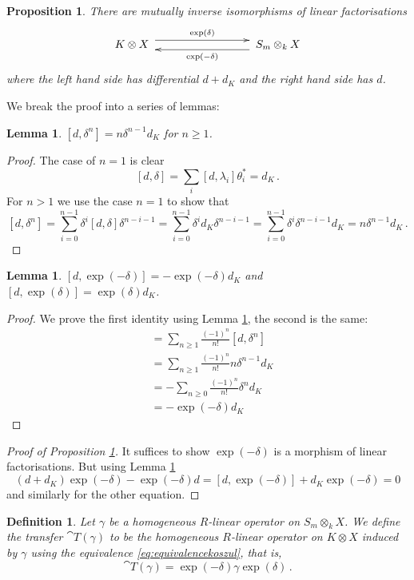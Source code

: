 \documentclass[english,letter paper,12pt,leqno]{article}
\newtheorem{proposition}[theorem]{Proposition}
\newtheorem{lemma}[theorem]{Lemma}
\theoremstyle{example}
\newtheorem{definition}[theorem]{Definition}
\numberwithin{equation}{section}
\def\be{\begin{equation}}
\def\ee{\end{equation}}
\begin{document}
\begin{proposition}\label{prop:equivalencekoszul} There are mutually inverse isomorphisms of linear factorisations
\be\label{eq:equivalencekoszul}
\xymatrix@C+5pc{ K \otimes X\; \ar@<1ex>[r]^-{ \exp(\delta) } & \;S_m \otimes_k X \ar@<1ex>[l]^-{ \exp(-\delta) } }
\ee
where the left hand side has differential $d + d_K$ and the right hand side has $d$.
\end{proposition}

We break the proof into a series of lemmas:

\begin{lemma}\label{lemma:pert1} $[d, \delta^n] = n \delta^{n-1} d_K$ for $n \ge 1$.
\end{lemma}
\begin{proof}
The case of $n = 1$ is clear
\[
[d, \delta] = \sum_i [d, \lambda_i] \theta_i^* = d_K\,.
\]
For $n > 1$ we use the case $n = 1$ to show that
\[
[ d, \delta^n ] = \sum_{i=0}^{n-1} \delta^i [d, \delta] \delta^{n-i-1} = \sum_{i=0}^{n-1} \delta^i d_K \delta^{n-i-1} = \sum_{i=0}^{n-1} \delta^i \delta^{n-i-1} d_K = n \delta^{n-1} d_K\,.
\]
\end{proof}

\begin{lemma}\label{lemma:pert2} $[ d, \exp(-\delta) ] = - \exp(-\delta) d_K$ and $[ d, \exp(\delta) ] = \exp(\delta) d_K$.
\end{lemma}
\begin{proof}
We prove the first identity using Lemma \ref{lemma:pert1}, the second is the same:
\begin{align*}
[d, \exp(-\delta)] &= \sum_{n \ge 1} \frac{(-1)^n}{n!} [ d, \delta^n ]\\
&= \sum_{n \ge 1} \frac{(-1)^n}{n!} n \delta^{n-1} d_K\\
&= - \sum_{n \ge 0} \frac{(-1)^n}{n!} \delta^n d_K\\
&= - \exp(-\delta) d_K
\end{align*}
\end{proof}

\begin{proof}[Proof of Proposition \ref{prop:equivalencekoszul}]
It suffices to show $\exp(-\delta)$ is a morphism of linear factorisations. But using Lemma \ref{lemma:pert2}
\[
(d + d_K) \exp(-\delta) - \exp(-\delta) d = [d, \exp(-\delta)] + d_K \exp(-\delta) = 0
\]
and similarly for the other equation.
\end{proof}

\begin{definition}\label{defn:transfer_contract} Let $\gamma$ be a homogeneous $R$-linear operator on $S_m \otimes_k X$. We define the \textsl{transfer} $\cat{T}(\gamma)$ to be the homogeneous $R$-linear operator on $K \otimes X$ induced by $\gamma$ using the equivalence \eqref{eq:equivalencekoszul}, that is,
\be
\cat{T}(\gamma) = \exp(-\delta) \gamma \exp(\delta)\,.
\ee
\end{definition}
\end{document}
